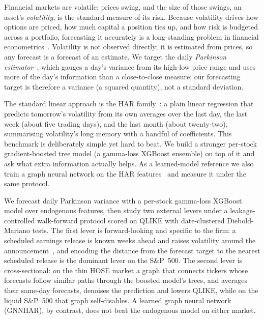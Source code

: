 \documentclass[runningheads]{llncs}
\begin{document}
Financial markets are volatile: prices swing, and the size of those swings, an asset's
\emph{volatility}, is the standard measure of its risk. Because volatility drives how options are
priced, how much capital a position ties up, and how risk is budgeted across a portfolio, forecasting
it accurately is a long-standing problem in financial econometrics~\cite{corsi2009}. Volatility is
not observed directly; it is estimated from prices, so any forecast is a forecast of an estimate. We
target the daily \emph{Parkinson estimator}~\cite{parkinson1980}, which gauges a day's variance from
its high-low price range and uses more of the day's information than a close-to-close measure; our
forecasting target is therefore a variance (a squared quantity), not a standard deviation.

The standard linear approach is the HAR family~\cite{corsi2009}: a plain linear regression that
predicts tomorrow's volatility from its own averages over the last day, the last week (about five
trading days), and the last month (about twenty-two), summarising volatility's long memory with a
handful of coefficients. This benchmark is deliberately simple yet hard to beat. We build a stronger
per-stock gradient-boosted tree model (a gamma-loss XGBoost ensemble) on top of it and ask what extra
information actually helps. As a learned-model reference we also train a graph neural network on the
HAR features~\cite{gnnhar2024} and measure it under the same protocol.

We forecast daily Parkinson variance with a per-stock gamma-loss XGBoost model over endogenous
features, then study two external levers under a leakage-controlled walk-forward protocol scored on
QLIKE with date-clustered Diebold-Mariano tests. The first lever is forward-looking and specific to
the firm: a scheduled earnings release is known weeks ahead and raises volatility around the
announcement~\cite{patell1981}, and encoding the distance from the forecast target to the nearest
scheduled release is the dominant lever on the S\&P~500. The second lever is cross-sectional: on the
thin HOSE market a graph that connects tickers whose forecasts follow similar paths through the boosted
model's trees, and averages their same-day forecasts, denoises the prediction and lowers QLIKE, while
on the liquid S\&P~500 that graph self-disables. A learned graph neural network (GNNHAR), by contrast,
does not beat the endogenous model on either market.
\end{document}
